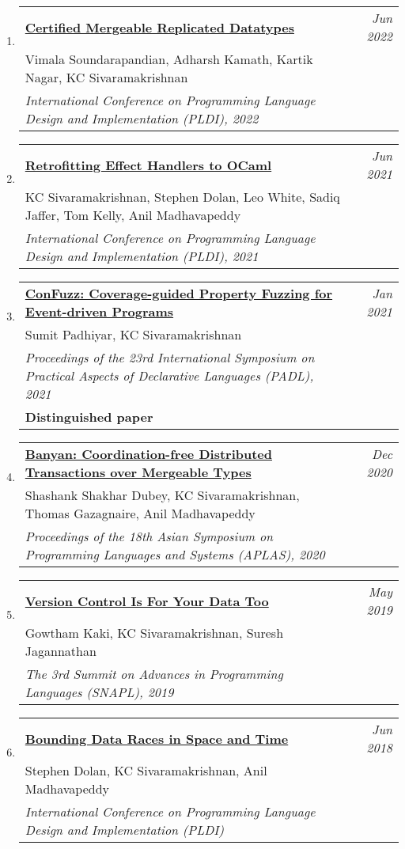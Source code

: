 \documentclass[10pt]{article}
\makeatletter
\newcommand{\lbar}[1]{{\color{#1}\ding{118}}\hspace*{2pt}}
\newenvironment{benumerate}[2]{
    \let\oldItem\item
    \def\item{\addtocounter{enumi}{-2}\oldItem}
    \begin{enumerate}[#2] \itemsep3pt
    \setcounter{enumi}{#1}
    \addtocounter{enumi}{1}}
  {\end{enumerate}}
\newenvironment{publication}[5]
{ \item
  \begin{tabular*}{7.5in}{p{6.3in}@{\extracolsep{\fill}}r}
    \href{#1}{\textbf{#2}} & \textit{#3}\\ #4 &\\ \textit{#5}&\\
  \end{tabular*}
} {}
\newenvironment{publicationNote}[6]
{ \item
  \begin{tabular*}{7.5in}{p{6.3in}@{\extracolsep{\fill}}r}
    \href{#1}{\textbf{#2}} & \textit{#3}\\ #4 &\\ \textit{#5}\\ \textbf{#6} \\
  \end{tabular*}
} {}
\newenvironment{region}[3]{%
  \vspace*{0.5ex}
  {\scalebox{1.4}{\textbf{#1}}}
  \begin{benumerate}{#3}{\color{RoyalBlue}#2}}
  {\end{benumerate}\vspace{0.8ex}}
\makeatother
\begin{document}
\begin{region} {\lbar{purple}Conference Publications}{{C}1}{15}

	\begin{publication} {https://kcsrk.info/papers/certified_mrdt.pdf}
		{Certified Mergeable Replicated Datatypes}
		{Jun 2022} {Vimala Soundarapandian, Adharsh Kamath, Kartik Nagar, KC Sivaramakrishnan}
		{International Conference on Programming Language Design and Implementation (PLDI), 2022}
  \end{publication}

	\begin{publication} {https://kcsrk.info/papers/retro-concurrency_pldi_21.pdf}
		{Retrofitting Effect Handlers to OCaml}
		{Jun 2021} {KC Sivaramakrishnan, Stephen Dolan, Leo White, Sadiq Jaffer, Tom Kelly, Anil Madhavapeddy}
		{International Conference on Programming Language Design and Implementation (PLDI), 2021}
  \end{publication}

	\begin{publicationNote} {https://kcsrk.info/papers/confuzz_padl21.pdf}
		{ConFuzz: Coverage-guided Property Fuzzing for Event-driven Programs}
		{Jan 2021} {Sumit Padhiyar, KC Sivaramakrishnan}
		{Proceedings of the 23rd International Symposium on Practical Aspects of Declarative Languages (PADL), 2021}
    {Distinguished paper}
  \end{publicationNote}

	\begin{publication} {https://kcsrk.info/papers/banyan_aplas20.pdf}
		{Banyan: Coordination-free Distributed Transactions over Mergeable Types}
		{Dec 2020} {Shashank Shakhar Dubey, KC Sivaramakrishnan, Thomas Gazagnaire, Anil Madhavapeddy}
		{Proceedings of the 18th Asian Symposium on Programming Languages and Systems (APLAS), 2020}
  \end{publication}

	\begin{publication} {http://kcsrk.info/papers/snapl19-mrdt.pdf}
		{Version Control Is For Your Data Too}
		{May 2019} {Gowtham Kaki, KC Sivaramakrishnan, Suresh Jagannathan}
		{The 3rd Summit on Advances in Programming Languages (SNAPL), 2019}
  \end{publication}

	\begin{publication} {http://kcsrk.info/papers/pldi18-memory.pdf}
		{Bounding Data Races in Space and Time}
		{Jun 2018} {Stephen Dolan, KC Sivaramakrishnan, Anil Madhavapeddy}
		{International Conference on Programming Language Design and Implementation (PLDI)}
  \end{publication}


\end{region}
\end{document}

